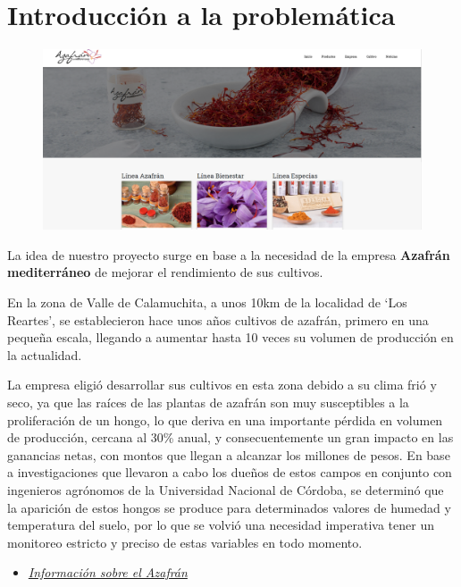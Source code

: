 \documentclass{article}
\begin{document}


\section{Introducción a la problemática}
\begin{figure}[ht]
\centering
\includegraphics[width=\textwidth]{Imagenes/Azafran.png} \par
\end{figure}

La idea de nuestro proyecto surge en base a la necesidad de la empresa \textbf{Azafrán mediterráneo} de mejorar el rendimiento de sus cultivos.

En la zona de Valle de Calamuchita, a unos 10km de la localidad de `Los Reartes', se establecieron hace unos años cultivos de azafrán, primero en una pequeña escala, llegando a aumentar hasta 10 veces su volumen de producción en la actualidad. 

La empresa eligió desarrollar sus cultivos en esta zona debido a su clima frió y seco, ya que las raíces de las plantas de azafrán son muy susceptibles a la proliferación de un hongo, lo que deriva en una importante pérdida en volumen de producción, cercana al 30\% anual, y consecuentemente un gran impacto en las ganancias netas, con montos que llegan a alcanzar los millones de pesos. En base a investigaciones que llevaron a cabo los dueños de estos campos en conjunto con ingenieros agrónomos de la Universidad Nacional de Córdoba, se determinó que la aparición de estos hongos se produce para determinados valores de humedad y temperatura del suelo, por lo que se volvió una necesidad imperativa tener un monitoreo estricto y preciso de estas variables en todo momento.

\begin{itemize}
    \item \href{https://www.infoagro.com/aromaticas/azafran2.htm}{\textit{Información sobre el Azafrán}}
\end{itemize}
\end{document}
